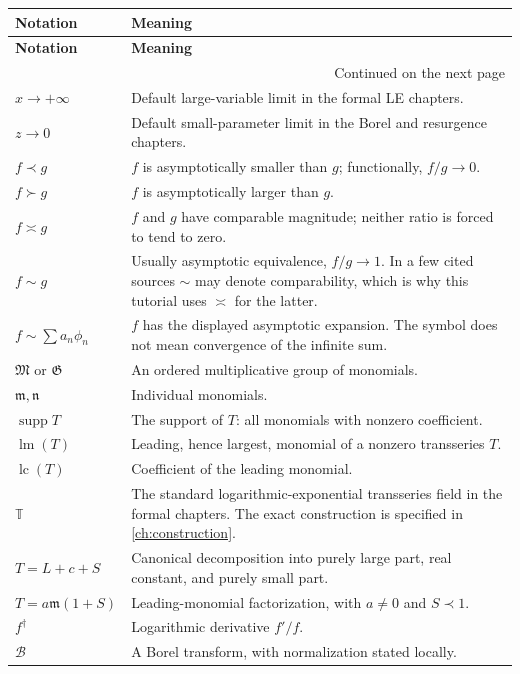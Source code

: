 \documentclass[11pt,openany]{book}
\theoremstyle{definition}
\theoremstyle{plain}
\theoremstyle{remark}
\newcommand{\T}{\mathbb{T}}
\newcommand{\M}{\mathfrak{M}}
\newcommand{\G}{\mathfrak{G}}
\newcommand{\m}{\mathfrak{m}}
\newcommand{\n}{\mathfrak{n}}
\newcommand{\asym}{\sim}
\newcommand{\precdom}{\prec}
\newcommand{\succdom}{\succ}
\newcommand{\equivdom}{\asymp}
\DeclareMathOperator{\supp}{supp}
\DeclareMathOperator{\lm}{lm}
\DeclareMathOperator{\lc}{lc}
\newcommand{\Borel}{\mathcal{B}}
\begin{document}
\renewcommand{\arraystretch}{1.16}
\begin{longtable}{@{}p{}p{}@{}}
\toprule
\textbf{Notation} & \textbf{Meaning}\\
\midrule
\endfirsthead
\toprule
\textbf{Notation} & \textbf{Meaning}\\
\midrule
\endhead
\midrule
\multicolumn{2}{r}{\small Continued on the next page}\\
\endfoot
\bottomrule
\endlastfoot

$x\to+\infty$ & Default large-variable limit in the formal LE chapters.\\
$z\to0$ & Default small-parameter limit in the Borel and resurgence chapters.\\
$f\precdom g$ & $f$ is asymptotically smaller than $g$; functionally,
$f/g\to0$.\\
$f\succdom g$ & $f$ is asymptotically larger than $g$.\\
$f\equivdom g$ & $f$ and $g$ have comparable magnitude; neither ratio is
forced to tend to zero.\\
$f\sim g$ & Usually asymptotic equivalence, $f/g\to1$. In a few cited sources
$\sim$ may denote comparability, which is why this tutorial uses
$\equivdom$ for the latter.\\
$f\asym\sum a_n\phi_n$ & $f$ has the displayed asymptotic expansion. The
symbol does not mean convergence of the infinite sum.\\
$\M$ or $\G$ & An ordered multiplicative group of monomials.\\
$\m,\n$ & Individual monomials.\\
$\supp T$ & The support of $T$: all monomials with nonzero coefficient.\\
$\lm(T)$ & Leading, hence largest, monomial of a nonzero transseries $T$.\\
$\lc(T)$ & Coefficient of the leading monomial.\\
$\T$ & The standard logarithmic-exponential transseries field in the formal
chapters. The exact construction is specified in \cref{ch:construction}.\\
$T=L+c+S$ & Canonical decomposition into purely large part, real constant,
and purely small part.\\
$T=a\m(1+S)$ & Leading-monomial factorization, with $a\ne0$ and
$S\precdom1$.\\
$f^\dagger$ & Logarithmic derivative $f'/f$.\\
$\Borel$ & A Borel transform, with normalization stated locally.\\

\end{longtable}
\end{document}
